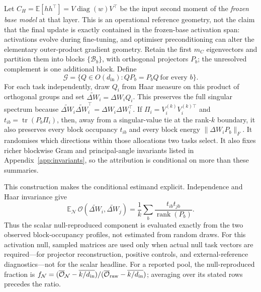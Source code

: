 Let $C_H = \mathbb{E}[h h^\top] = V\operatorname{diag}(w)V^\top$ be the input second moment of the
\emph{frozen base model} at that layer. This is an operational reference geometry, not the claim
that the final update is exactly contained in the frozen-base activation span: activations evolve
during fine-tuning, and optimiser preconditioning can alter the elementary outer-product
gradient geometry.
Retain the first $m_C$ eigenvectors and partition them into blocks $\{\mathcal{B}_b\}$, with
orthogonal projectors $P_b$; the unresolved complement is one additional block. Define
\begin{equation}
 \mathcal{G}=\{Q\in O(d_{\mathrm{in}}):QP_b=P_bQ\ \text{for every }b\}.
 \label{eq:group}
\end{equation}
For each task independently, draw $Q_i$ from Haar measure on this product of orthogonal groups
and set $\widetilde{\Delta W}_i=\Delta W_iQ_i$. This preserves the full singular spectrum because
$\widetilde{\Delta W}_i\widetilde{\Delta W}_i^\top=\Delta W_i\Delta W_i^\top$. If
$\Pi_i=V_i^{(k)}V_i^{(k)\top}$ and $t_{ib}=\operatorname{tr}(P_b\Pi_i)$, then, away from a
singular-value tie at the rank-$k$ boundary, it also preserves every
block occupancy $t_{ib}$ and every block energy $\|\Delta W_iP_b\|_F$. It randomises which
directions within those allocations two tasks select.
It also fixes richer blockwise Gram and principal-angle invariants listed in
Appendix~\ref{app:invariants}, so the attribution is conditional on more than these summaries.

This construction makes the conditional estimand explicit. Independence and Haar invariance give
\begin{equation}
 \mathbb{E}_{\mathcal N}\,\mathcal O(\widetilde{\Delta W}_i,
 \widetilde{\Delta W}_j)
 =\frac{1}{k}\sum_b\frac{t_{ib}t_{jb}}{\operatorname{rank}(P_b)}.
 \label{eq:null-expectation}
\end{equation}
Thus the scalar null-reproduced component is evaluated exactly from the two observed block-occupancy
profiles, not estimated from random draws. For this activation null, sampled matrices are used only when actual null task
vectors are required---for projector reconstruction, positive controls, and external-reference
diagnostics---not for the scalar headline.
For a reported pool, the null-reproduced fraction is
$f_{\mathcal N}=(\overline{\mathcal O}_{\mathcal N}-\overline{k/d_{\rm in}})/
(\overline{\mathcal O}_{\rm raw}-\overline{k/d_{\rm in}})$; averaging over its stated rows
precedes the ratio.

